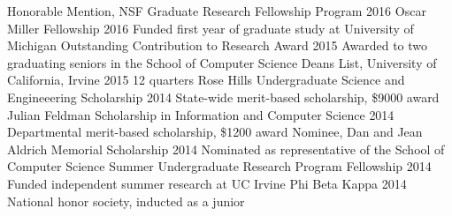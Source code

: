 \begin{cvhonors}
  \cvaward
    {Honorable Mention, NSF Graduate Research Fellowship Program}
    {}
    {2016}
  \cvawardwithdes
    {Oscar Miller Fellowship}
    {}
    {2016}
    {Funded first year of graduate study at University of Michigan}
  \cvawardwithdes
    {Outstanding Contribution to Research Award}
    {}
    {2015}
    {Awarded to two graduating seniors in the School of Computer Science}
  \cvawardwithdes
    {Deans List, University of California, Irvine}
    {}
    {2015}
    {12 quarters}
  \cvawardwithdes
    {Rose Hills Undergraduate Science and Engineeering Scholarship}
    {}
    {2014}
    {State-wide merit-based scholarship, \$9000 award}
  \cvawardwithdes
    {Julian Feldman Scholarship in Information and Computer Science}
    {}
    {2014}
    {Departmental merit-based scholarship, \$1200 award}
  \cvawardwithdes
    {Nominee, Dan and Jean Aldrich Memorial Scholarship}
    {}
    {2014}
    {Nominated as representative of the School of Computer Science}
  \cvawardwithdes
    {Summer Undergraduate Research Program Fellowship}
    {}
    {2014}
    {Funded independent summer research at UC Irvine}
  \cvawardwithdes
    {Phi Beta Kappa}
    {}
    {2014}
    {National honor society, inducted as a junior}
\end{cvhonors}
